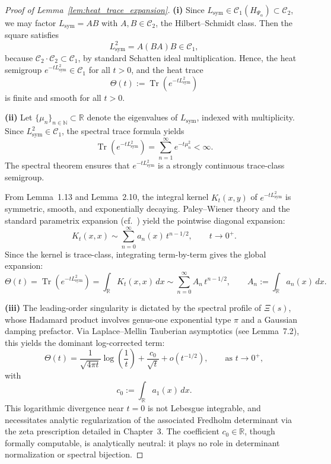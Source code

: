 \begin{proof}[Proof of Lemma~\ref{lem:heat_trace_expansion}]
\textbf{(i)} Since \( L_{\mathrm{sym}} \in \mathcal{C}_1(H_{\Psi_\alpha}) \subset \mathcal{C}_2 \), we may factor \( L_{\mathrm{sym}} = AB \) with \( A, B \in \mathcal{C}_2 \), the Hilbert–Schmidt class. Then the square satisfies
\[
L_{\mathrm{sym}}^2 = A (BA) B \in \mathcal{C}_1,
\]
because \( \mathcal{C}_2 \cdot \mathcal{C}_2 \subset \mathcal{C}_1 \), by standard Schatten ideal multiplication. Hence, the heat semigroup \( e^{-tL_{\mathrm{sym}}^2} \in \mathcal{C}_1 \) for all \( t > 0 \), and the heat trace
\[
\Theta(t) := \operatorname{Tr}(e^{-tL_{\mathrm{sym}}^2})
\]
is finite and smooth for all \( t > 0 \).

\textbf{(ii)} Let \( \{ \mu_n \}_{n \in \mathbb{N}} \subset \mathbb{R} \) denote the eigenvalues of \( L_{\mathrm{sym}} \), indexed with multiplicity. Since \( L_{\mathrm{sym}}^2 \in \mathcal{C}_1 \), the spectral trace formula yields
\[
\operatorname{Tr}(e^{-tL_{\mathrm{sym}}^2}) = \sum_{n=1}^{\infty} e^{-t \mu_n^2} < \infty.
\]
The spectral theorem ensures that \( e^{-tL_{\mathrm{sym}}^2} \) is a strongly continuous trace-class semigroup.

From Lemma~1.13 and Lemma~2.10, the integral kernel \( K_t(x,y) \) of \( e^{-tL_{\mathrm{sym}}^2} \) is symmetric, smooth, and exponentially decaying. Paley–Wiener theory and the standard parametrix expansion (cf.~\cite[Ch.~III]{Korevaar2004Tauberian}) yield the pointwise diagonal expansion:
\[
K_t(x,x) \sim \sum_{n=0}^{\infty} a_n(x) \, t^{n - 1/2}, \qquad t \to 0^+.
\]
Since the kernel is trace-class, integrating term-by-term gives the global expansion:
\[
\Theta(t) = \operatorname{Tr}(e^{-tL_{\mathrm{sym}}^2}) = \int_{\mathbb{R}} K_t(x,x) \, dx \sim \sum_{n=0}^{\infty} A_n \, t^{n - 1/2}, \qquad A_n := \int_{\mathbb{R}} a_n(x) \, dx.
\]

\textbf{(iii)} The leading-order singularity is dictated by the spectral profile of \( \Xi(s) \), whose Hadamard product involves genus-one exponential type \( \pi \) and a Gaussian damping prefactor. Via Laplace–Mellin Tauberian asymptotics (see Lemma~7.2), this yields the dominant log-corrected term:
\[
\Theta(t) = \frac{1}{\sqrt{4\pi t}} \log\left( \frac{1}{t} \right) + \frac{c_0}{\sqrt{t}} + o(t^{-1/2}), \qquad \text{as } t \to 0^+,
\]
with
\[
c_0 := \int_{\mathbb{R}} a_1(x) \, dx.
\]
This logarithmic divergence near \( t = 0 \) is not Lebesgue integrable, and necessitates analytic regularization of the associated Fredholm determinant via the zeta prescription detailed in Chapter~3. The coefficient \( c_0 \in \mathbb{R} \), though formally computable, is analytically neutral: it plays no role in determinant normalization or spectral bijection.
\end{proof}
